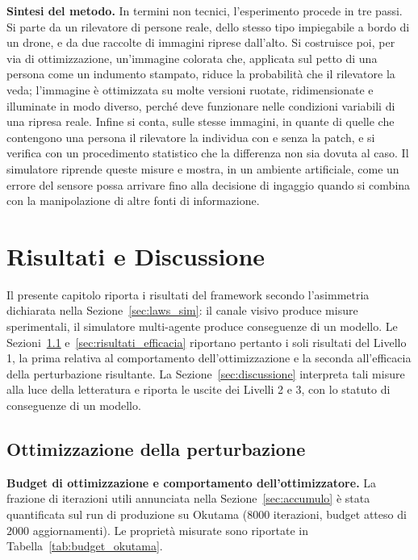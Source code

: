 \ifstampa\documentclass[a4paper,12pt,twoside,openright]{report}\else\documentclass[a4paper,12pt]{report}\fi
\newif\ifrevisione \revisionefalse
\DeclareRobustCommand{\rev}[1]{\ifrevisione{\color{blue!65!black}#1}\else#1\fi}
\newcommand{\notarev}[1]{\ifrevisione\par\medskip\noindent\fcolorbox{blue!65!black}{blue!4}{\parbox{\dimexpr\linewidth-2\fboxsep-2\fboxrule\relax}{\small\setstretch{1}\textbf{Nota per la revisione.} #1}}\par\medskip\fi}
\begin{document}
\rev{\textbf{Sintesi del metodo.}
In termini non tecnici, l'esperimento procede in tre passi. Si parte da un
rilevatore di persone reale, dello stesso tipo impiegabile a bordo di un drone,
e da due raccolte di immagini riprese dall'alto. Si costruisce poi, per via di
ottimizzazione, un'immagine colorata che, applicata sul petto di una persona
come un indumento stampato, riduce la probabilità che il rilevatore la veda;
l'immagine è ottimizzata su molte versioni ruotate, ridimensionate e illuminate
in modo diverso, perché deve funzionare nelle condizioni variabili di una
ripresa reale. Infine si conta, sulle stesse immagini, in quante di quelle che
contengono una persona il rilevatore la individua con e senza la patch, e si
verifica con un procedimento statistico che la differenza non sia dovuta al
caso. Il simulatore riprende queste misure e mostra, in un ambiente
artificiale, come un errore del sensore possa arrivare fino alla decisione di
ingaggio quando si combina con la manipolazione di altre fonti di
informazione.}

\notarev{Paragrafo divulgativo richiesto dal Prof. Buffa.}

\chapter{Risultati e Discussione}
\label{cap5}

Il presente capitolo riporta i risultati del framework secondo l'asimmetria dichiarata nella Sezione~\ref{sec:laws_sim}: il canale visivo produce misure sperimentali, il simulatore multi-agente produce conseguenze di un modello. Le Sezioni~\ref{sec:risultati_ottimizzazione} e~\ref{sec:risultati_efficacia} riportano pertanto i soli risultati del Livello 1, la prima relativa al comportamento dell'ottimizzazione e la seconda all'efficacia della perturbazione risultante. La Sezione~\ref{sec:discussione} interpreta tali misure alla luce della letteratura \rev{e riporta le uscite dei Livelli 2 e 3, con lo statuto di conseguenze di un modello}.

\section{Ottimizzazione della perturbazione}
\label{sec:risultati_ottimizzazione}

\textbf{Budget di ottimizzazione e comportamento dell'ottimizzatore.}
\label{sec:budget_effettivo}
La frazione di iterazioni utili annunciata nella Sezione~\ref{sec:accumulo} è stata quantificata sul run di produzione su Okutama ($8000$ iterazioni, budget atteso di $2000$ aggiornamenti). Le proprietà misurate sono riportate in Tabella~\ref{tab:budget_okutama}.
\end{document}
